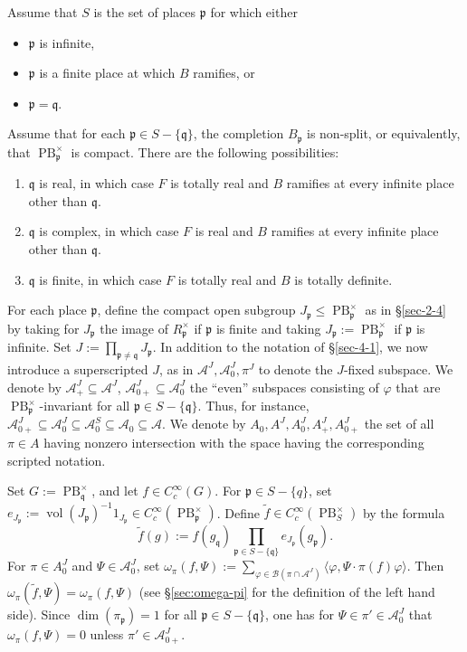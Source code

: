 \documentclass[reqno,10pt]{amsart}
\theoremstyle{plain} %
\theoremstyle{definition}
\theoremstyle{plain} %
\theoremstyle{remark}
\theoremstyle{itplain} %
\theoremstyle{remark} %
\renewcommand{\leq}{\leqslant}
\numberwithin{equation}{section}
\def\PB{\operatorname{PB}}
\DeclareMathOperator{\vol}{vol}
\begin{document}
Assume that $S$ is the set of places $\mathfrak{p}$ for which either
\begin{itemize}
\item $\mathfrak{p}$ is infinite,
\item $\mathfrak{p}$ is a finite place at which $B$ ramifies, or
\item $\mathfrak{p} = \mathfrak{q}$.
\end{itemize}
Assume that for each $\mathfrak{p} \in S - \{\mathfrak{q}\}$, the completion $B_\mathfrak{p}$ is non-split, or equivalently, that $\PB^\times_\mathfrak{p}$ is compact.  There are the following possibilities:
\begin{enumerate}
\item $\mathfrak{q}$ is real, in which case $F$ is totally real and $B$ ramifies at every infinite place other than $\mathfrak{q}$.
\item $\mathfrak{q}$ is complex, in which case $F$ is real and $B$ ramifies at every infinite place other than $\mathfrak{q}$.
\item $\mathfrak{q}$ is finite, in which case $F$ is totally real and $B$ is totally definite.
\end{enumerate}
For each place $\mathfrak{p}$, define the compact open subgroup $J_\mathfrak{p} \leq \PB^\times_\mathfrak{p}$ as in \S\ref{sec-2-4} by taking for $J_\mathfrak{p}$ the image of $R_\mathfrak{p}^\times$ if $\mathfrak{p}$ is finite and taking $J_\mathfrak{p} := \PB^\times_\mathfrak{p}$ if $\mathfrak{p}$ is infinite.  Set $J := \prod_{\mathfrak{p} \neq \mathfrak{q}} J_\mathfrak{p}$.  In addition to the notation of \S\ref{sec-4-1}, we now introduce a superscripted $J$, as in $\mathcal{A}^J, \mathcal{A}_0^J, \pi^J$ to denote the $J$-fixed subspace.  We denote by $\mathcal{A}^J_+ \subseteq \mathcal{A}^J$, $\mathcal{A}^J_{0+} \subseteq \mathcal{A}_0^J$ the ``even'' subspaces consisting of $\varphi$ that are $\PB^\times_{\mathfrak{p}}$-invariant for all $\mathfrak{p} \in S - \{\mathfrak{q}\}$.  Thus, for instance, $\mathcal{A}_{0+}^J \subseteq \mathcal{A}_0^J \subseteq \mathcal{A}_0^S \subseteq \mathcal{A}_0 \subseteq \mathcal{A}$.  We denote by $A_0, A^J, A_0^J, A^J_+, A^J_{0+}$ the set of all $\pi \in A$ having nonzero intersection with the space having the corresponding scripted notation.

Set $G := \PB^\times_\mathfrak{q}$, and let $f \in C_c^\infty(G)$.  For $\mathfrak{p} \in S - \{q\}$, set $e_{J_\mathfrak{p}} := \vol(J_\mathfrak{p})^{-1} 1_{J_\mathfrak{p}} \in C_c^\infty(\PB^\times_\mathfrak{p})$.  Define $\tilde{f} \in C_c^\infty(\PB^\times_S)$ by the formula
\[
  \tilde{f} (g) := f(g_\mathfrak{q}) \prod_{\mathfrak{p} \in S - \{\mathfrak{q} \}} e_{J_\mathfrak{p}}(g_\mathfrak{p}).
\]
For $\pi \in A_0^J$ and $\Psi \in \mathcal{A}_0^J$, set $\omega_\pi(f,\Psi) := \sum_{\varphi \in \mathcal{B}(\pi \cap \mathcal{A}^J)} \langle \varphi, \Psi \cdot \pi(f) \varphi \rangle$.
Then $\omega_\pi(\tilde{f},\Psi) = \omega_\pi(f,\Psi)$ (see \S\ref{sec:omega-pi} for the definition of the left hand side).  Since $\dim(\pi_\mathfrak{p}) = 1$ for all $\mathfrak{p} \in S - \{\mathfrak{q} \}$, one has for $\Psi \in \pi' \in \mathcal{A}_0^J$ that $\omega_\pi(f,\Psi) = 0$ unless $\pi ' \in \mathcal{A}_{0+}^J$.
\end{document}
